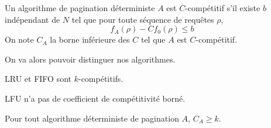 \begin{definition}[Compétitivité]
Un algorithme de pagination déterministe $A$ est $C$-compétitif s'il existe $b$ indépendant de $N$ tel que pour toute séquence de requêtes $\rho$, 
$$
f_A(\rho) -Cf_0(\rho) \leq b
$$
On note $C_A$ la borne inférieure des $C$ tel que $A$ est $C$-compétitif.
\end{definition}

On va alors pouvoir distinguer nos algorithmes.

\begin{theorem}\label{LRUth1}
LRU et FIFO sont $k$-compétitifs.
\end{theorem}

\begin{theorem}\label{LRUth2}
LFU n'a pas de coefficient de compétitivité borné.
\end{theorem}

\begin{theorem}[Optimalité]
Pour tout algorithme déterministe de pagination $A$, $C_A\geq k$.
\end{theorem}


